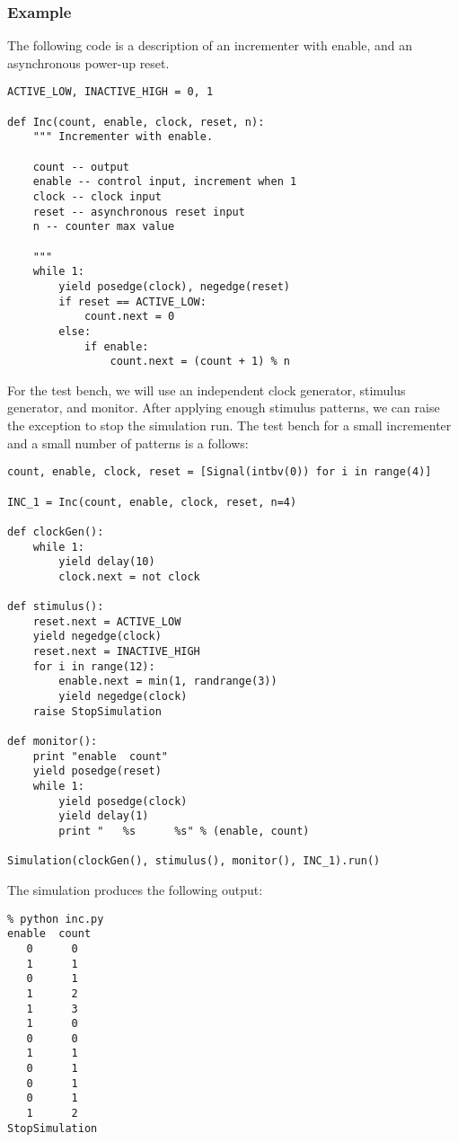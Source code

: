 \subsubsection{Example \label{model-seq-ex}}
The following code is a description of an incrementer with enable, and
an asynchronous power-up reset.

\begin{verbatim}
ACTIVE_LOW, INACTIVE_HIGH = 0, 1

def Inc(count, enable, clock, reset, n):
    """ Incrementer with enable.
    
    count -- output
    enable -- control input, increment when 1
    clock -- clock input
    reset -- asynchronous reset input
    n -- counter max value

    """
    while 1:
        yield posedge(clock), negedge(reset)
        if reset == ACTIVE_LOW:
            count.next = 0
        else:
            if enable:
                count.next = (count + 1) % n
\end{verbatim}

For the test bench, we will use an independent clock generator, stimulus
generator, and monitor. After applying enough stimulus patterns, we
can raise the  exception to stop the
simulation run. The test bench for a small incrementer and a small
number of patterns is a follows:

\begin{verbatim}
count, enable, clock, reset = [Signal(intbv(0)) for i in range(4)]

INC_1 = Inc(count, enable, clock, reset, n=4)

def clockGen():
    while 1:
        yield delay(10)
        clock.next = not clock

def stimulus():
    reset.next = ACTIVE_LOW
    yield negedge(clock)
    reset.next = INACTIVE_HIGH
    for i in range(12):
        enable.next = min(1, randrange(3))
        yield negedge(clock)
    raise StopSimulation

def monitor():
    print "enable  count"
    yield posedge(reset)
    while 1:
        yield posedge(clock)
        yield delay(1)
        print "   %s      %s" % (enable, count)
        
Simulation(clockGen(), stimulus(), monitor(), INC_1).run()
\end{verbatim}

The simulation produces the following output:
\begin{verbatim}
% python inc.py
enable  count
   0      0
   1      1
   0      1
   1      2
   1      3
   1      0
   0      0
   1      1
   0      1
   0      1
   0      1
   1      2
StopSimulation
\end{verbatim}

